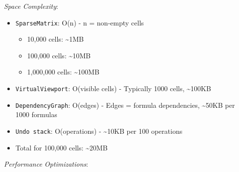 \documentclass[11pt]{article}
\begin{document}
\emph{Space Complexity}:

\begin{itemize}
\item \texttt{SparseMatrix}: O(n) - n = non-empty cells
\begin{itemize}
\item 10,000 cells: \textasciitilde{}1MB
\item 100,000 cells: \textasciitilde{}10MB
\item 1,000,000 cells: \textasciitilde{}100MB
\end{itemize}
\item \texttt{VirtualViewport}: O(visible cells) - Typically 1000 cells, \textasciitilde{}100KB
\item \texttt{DependencyGraph}: O(edges) - Edges = formula dependencies, \textasciitilde{}50KB per 1000 formulas
\item \texttt{Undo stack}: O(operations) - \textasciitilde{}10KB per 100 operations
\item Total for 100,000 cells: \textasciitilde{}20MB
\end{itemize}

\emph{Performance Optimizations}:
\end{document}
